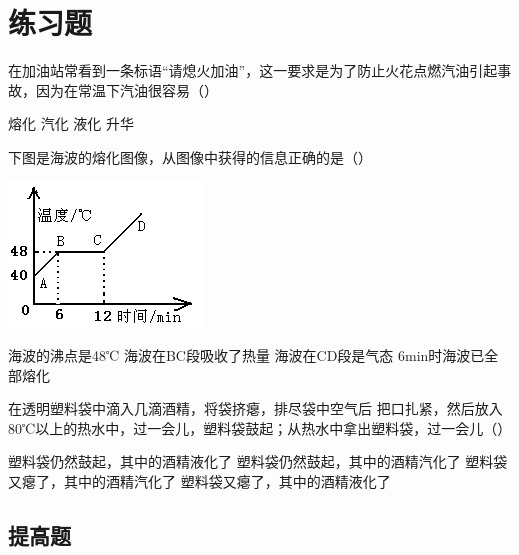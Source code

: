 \documentclass[12pt]{exam}
\begin{document}
\section{练习题}
\begin{questions}
\question
在加油站常看到一条标语“请熄火加油”，这一要求是为了防止火花点燃汽油引起事故，因为在常温下汽油很容易（\answerline*[B]）

\begin{oneparchoices}
\choice 熔化
\choice 汽化
\choice 液化
\choice 升华
\end{oneparchoices}


\question
下图是海波的熔化图像，从图像中获得的信息正确的是（\answerline*[B]）

\begin{multicols}{2}
\begin{linefig}{}
\end{linefig}
 \includegraphics[width=\linewidth]{figures/图片1.png} 
\columnbreak
\begin{choices}
\choice 海波的沸点是48℃
\choice 海波在BC段吸收了热量
\choice 海波在CD段是气态
\choice 6min时海波已全部熔化
\end{choices}
\end{multicols}



\question
在透明塑料袋中滴入几滴酒精，将袋挤瘪，排尽袋中空气后 把口扎紧，然后放入80℃以上的热水中，过一会儿，塑料袋鼓起；从热水中拿出塑料袋，过一会儿（\answerline*[D]）
\begin{choices}
\choice 塑料袋仍然鼓起，其中的酒精液化了
\choice 塑料袋仍然鼓起，其中的酒精汽化了
\choice 塑料袋又瘪了，其中的酒精汽化了
\choice 塑料袋又瘪了，其中的酒精液化了
\end{choices}  




\end{questions}


\begin{advanceexercises}
\section{提高题}

\end{advanceexercises}



\end{document}

